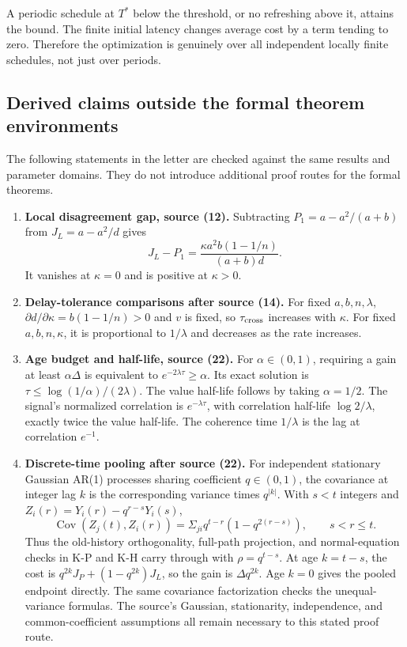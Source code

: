 \documentclass[11pt,letterpaper]{article}
\newcommand{\Cov}{\operatorname{Cov}}
\begin{document}
A periodic schedule at $T^*$ below the threshold, or no refreshing above it, attains the bound. The finite initial latency changes average cost by a term tending to zero. Therefore the optimization is genuinely over all independent locally finite schedules, not just over periods.

\subsection{Derived claims outside the formal theorem environments}
The following statements in the letter are checked against the same results and parameter domains. They do not introduce additional proof routes for the formal theorems.

\begin{enumerate}
\item \textbf{Local disagreement gap, source (12).}
Subtracting $P_1=a-a^2/(a+b)$ from $J_L=a-a^2/d$ gives
\[
J_L-P_1=\frac{\kappa a^2b(1-1/n)}{(a+b)d}.
\]
It vanishes at $\kappa=0$ and is positive at $\kappa>0$.

\item \textbf{Delay-tolerance comparisons after source (14).}
For fixed $a,b,n,\lambda$, $\partial d/\partial\kappa=b(1-1/n)>0$ and $v$ is fixed, so $\tau_{\rm cross}$ increases with $\kappa$. For fixed $a,b,n,\kappa$, it is proportional to $1/\lambda$ and decreases as the rate increases.

\item \textbf{Age budget and half-life, source (22).}
For $\alpha\in(0,1)$, requiring a gain at least $\alpha\Delta$ is equivalent to $e^{-2\lambda\tau}\ge\alpha$. Its exact solution is $\tau\le\log(1/\alpha)/(2\lambda)$. The value half-life follows by taking $\alpha=1/2$. The signal's normalized correlation is $e^{-\lambda\tau}$, with correlation half-life $\log 2/\lambda$, exactly twice the value half-life. The coherence time $1/\lambda$ is the lag at correlation $e^{-1}$.

\item \textbf{Discrete-time pooling after source (22).}
For independent stationary Gaussian AR(1) processes sharing coefficient $q\in(0,1)$, the covariance at integer lag $k$ is the corresponding variance times $q^{|k|}$. With $s<t$ integers and $Z_i(r)=Y_i(r)-q^{r-s}Y_i(s)$,
\[
\Cov(Z_j(t),Z_i(r))=\Sigma_{ji}q^{t-r}(1-q^{2(r-s)}),\qquad s<r\le t.
\]
Thus the old-history orthogonality, full-path projection, and normal-equation checks in K-P and K-H carry through with $\rho=q^{t-s}$. At age $k=t-s$, the cost is $q^{2k}J_P+(1-q^{2k})J_L$, so the gain is $\Delta q^{2k}$. Age $k=0$ gives the pooled endpoint directly. The same covariance factorization checks the unequal-variance formulas. The source's Gaussian, stationarity, independence, and common-coefficient assumptions all remain necessary to this stated proof route.


\end{enumerate}
\end{document}
